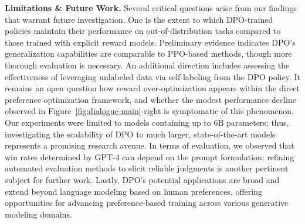 \textbf{Limitations \& Future Work.} Several critical questions arise from our findings that warrant future investigation. One is the extent to which DPO-trained policies maintain their performance on out-of-distribution tasks compared to those trained with explicit reward models. Preliminary evidence indicates DPO's generalization capabilities are comparable to PPO-based methods, though more thorough evaluation is necessary. An additional direction includes assessing the effectiveness of leveraging unlabeled data via self-labeling from the DPO policy. It remains an open question how reward over-optimization appears within the direct preference optimization framework, and whether the modest performance decline observed in Figure~\ref{fig:dialogue-main}-right is symptomatic of this phenomenon. Our experiments were limited to models containing up to 6B parameters; thus, investigating the scalability of DPO to much larger, state-of-the-art models represents a promising research avenue. In terms of evaluation, we observed that win rates determined by GPT-4 can depend on the prompt formulation; refining automated evaluation methods to elicit reliable judgments is another pertinent subject for further work. Lastly, DPO's potential applications are broad and extend beyond language modeling based on human preferences, offering opportunities for advancing preference-based training across various generative modeling domains.